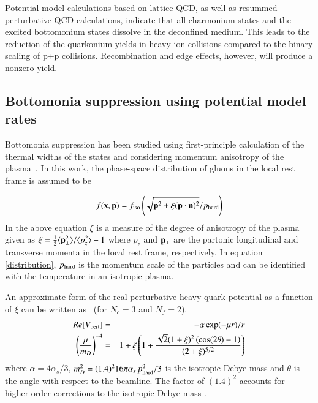 Potential model calculations based on lattice QCD, as well as resummed 
perturbative QCD calculations, indicate that all charmonium states and the
excited bottomonium states dissolve in the deconfined medium. This leads to 
the reduction of the quarkonium yields in heavy-ion collisions 
compared to the binary scaling of p+p collisions. Recombination and edge
effects, however, will produce a nonzero yield.


              
\subsection{Bottomonia suppression using potential model rates}

Bottomonia suppression has been studied using first-principle
calculation of the thermal widths of the states and considering 
momentum anisotropy of the plasma~\cite{Strickland:2011aa,Krouppa:2016jcl,Krouppa:2018lkt}.
In this work, the phase-space distribution of gluons in the local
rest frame is assumed to be 

\begin{equation} 
f({\bf x},{\bf p}) = f_{\rm iso}\left(\sqrt{{\bf p}^2+ \xi({\bf p}\cdot{\bf n})^2 }  / 
p_{\rm hard} \right) 
\label{distribution}
\end{equation} 
In the above equation $\xi$ is a measure of the degree of anisotropy of the plasma given as 
$\xi = \frac{1}{2} \langle 
{\bf p}_\perp^2\rangle/\langle p_z^2\rangle -1$
where $p_z$ and 
${\bf p}_\perp $ are the partonic longitudinal and transverse momenta in the local
rest frame, respectively. In equation \ref{distribution}, $p_{\rm hard}$ is the momentum  
scale of the particles and can be identified with the temperature
in an isotropic plasma. 

An approximate form of the real perturbative heavy quark potential as a function of
$\xi$ can be written as~\cite{Dumitru:2007hy} (for $N_c=3$ and $N_f=2$). 
\begin{eqnarray}
Re[V_{\rm pert}] &=& - \alpha \exp(-\mu r)/r \nonumber \\
\left(\frac{\mu}{m_D}\right)^{-4} &=&  
1 + \xi\left(1 + \frac{\sqrt{2}(1+\xi)^2\left(\cos(2\theta) - 1 \right)}{(2+ \xi)^{5/2}} \right) 
\label{eq:muparam}
\end{eqnarray}
where $\alpha = 4\alpha_s/3$, $m_D^2 = (1.4)^2 16 \pi \alpha_s  \, p_{\rm hard}^2/3$ is the isotropic
Debye mass and $\theta$ is the angle with respect to the beamline.  
The factor of $(1.4)^2$ accounts for higher-order corrections to the isotropic Debye 
mass \cite{Kaczmarek:2004gv}.

